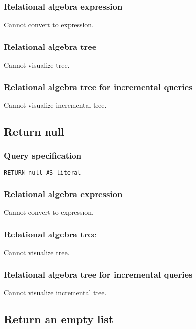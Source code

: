 \subsubsection*{Relational algebra expression}

Cannot convert to expression.

\subsubsection*{Relational algebra tree}

Cannot visualize tree.

\subsubsection*{Relational algebra tree for incremental queries}

Cannot visualize incremental tree.

\subsection{Return null}

\subsubsection*{Query specification}

\begin{lstlisting}
RETURN null AS literal
\end{lstlisting}

\subsubsection*{Relational algebra expression}

Cannot convert to expression.

\subsubsection*{Relational algebra tree}

Cannot visualize tree.

\subsubsection*{Relational algebra tree for incremental queries}

Cannot visualize incremental tree.

\subsection{Return an empty list}

